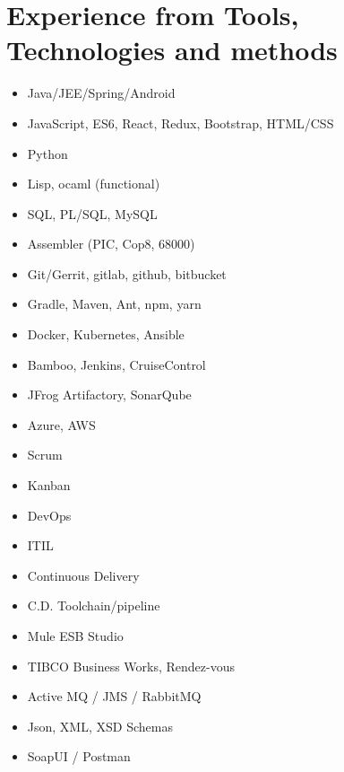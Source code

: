 \documentclass[11pt,a4paper,sans]{moderncv}
\begin{document}
\section{Experience from Tools, Technologies and methods}
\begin{cvcolumns}
        {\begin{itemize}
            \item Java/JEE/Spring/Android 
            \item JavaScript, ES6, React, Redux, Bootstrap, HTML/CSS
            \item Python
            \item Lisp, ocaml  (functional)
            \item SQL, PL/SQL, MySQL 
            \item Assembler (PIC, Cop8, 68000) 
        \end{itemize}}
	{\begin{itemize}
        \item Git/Gerrit, gitlab, github, bitbucket 
        \item Gradle, Maven, Ant, npm, yarn
        \item Docker, Kubernetes, Ansible
        \item Bamboo, Jenkins, CruiseControl 
        \item JFrog Artifactory, SonarQube
        \item Azure, AWS 
    \end{itemize}}
\end{cvcolumns} 
\begin{cvcolumns}
	{\begin{itemize}
            \item Scrum
            \item Kanban
            \item DevOps
            \item ITIL
            \item Continuous Delivery 
            \item C.D. Toolchain/pipeline 
    \end{itemize}}
    	{\begin{itemize}
                \item Mule ESB Studio
                \item TIBCO Business Works, Rendez-vous 
                \item Active MQ / JMS / RabbitMQ 
                \item Json, XML, XSD Schemas 
                \item SoapUI / Postman
        \end{itemize}}
\end{cvcolumns} 
\end{document}
